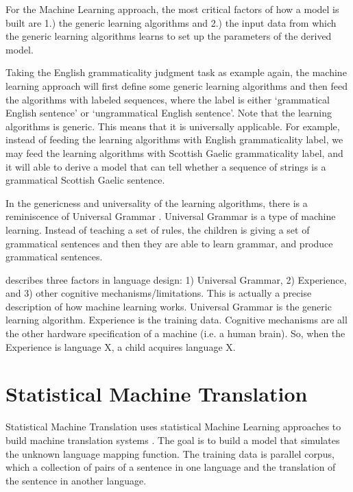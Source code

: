 \documentclass[final]{ua-thesis}
\numberwithin{equation}{section}
\begin{document}
For the Machine Learning approach, the most critical factors of how a model is built are 1.) the generic learning algorithms and 2.) the input data from which the generic learning algorithms learns to set up the parameters of the derived model.  

Taking the English grammaticality judgment task as example again, the machine learning approach will first define some generic learning algorithms and then feed the algorithms with labeled sequences, where the label is either `grammatical English sentence' or `ungrammatical English sentence'. Note that the learning algorithms is generic. This means that it is universally applicable. For example, instead of feeding the learning algorithms with English grammaticality label, we may feed the learning algorithms with Scottish Gaelic grammaticality label, and it will able to derive a model that can tell whether a sequence of strings is a grammatical Scottish Gaelic sentence. 


In the genericness and universality of the learning algorithms, there is a reminiscence of Universal Grammar \citep{chomsky2007}. 
Universal Grammar is a type of machine learning. Instead of teaching a set of rules, the children is giving a set of grammatical sentences and then they are able to learn grammar, and produce grammatical sentences. 

\citet{chom2005_three_factors} describes three factors in language design: 1) Universal Grammar, 2) Experience, and 3) other cognitive mechanisms/limitations. This is actually a precise description of how machine learning works. Universal Grammar is the generic learning algorithm. Experience is the training data. Cognitive mechanisms are all the other hardware specification of a machine (i.e. a human brain). So, when the Experience is language X, a child acquires language X.  

  


\section{Statistical Machine Translation}
Statistical Machine Translation uses statistical Machine Learning approaches to build machine translation systems \citep{brown1988statistical, brown1990statistical, brown1993mathematics, koehn2009statistical, moses}. The goal is to build a model that simulates the unknown language mapping function. The training data is parallel corpus, which a collection of pairs of a sentence in one language and the translation of the sentence in another language.
\end{document}
